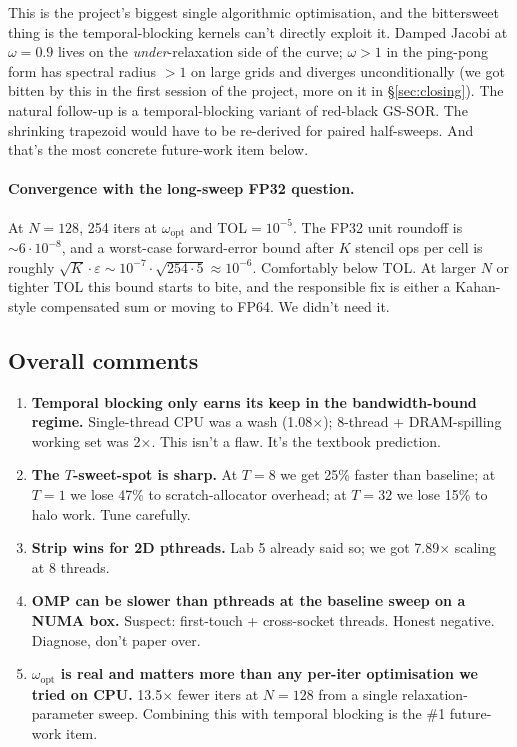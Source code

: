 \documentclass[11pt]{article}
\begin{document}
This is the project's biggest single algorithmic optimisation, and
the bittersweet thing is the temporal-blocking kernels can't directly
exploit it.  Damped Jacobi at $\omega = 0.9$ lives on the
\emph{under}-relaxation side of the curve; $\omega{>}1$ in the
ping-pong form has spectral radius $>1$ on large grids and diverges
unconditionally (we got bitten by this in the first session of the
project, more on it in §\ref{sec:closing}).  The natural follow-up
is a temporal-blocking variant of red-black GS-SOR. The
shrinking trapezoid would have to be re-derived for paired
half-sweeps. And that's the most concrete future-work item below.

\paragraph{Convergence with the long-sweep FP32 question.}  At
$N{=}128$, 254 iters at $\omega_{\text{opt}}$ and TOL$=10^{-5}$.
The FP32 unit roundoff is $\sim 6\cdot 10^{-8}$, and a worst-case
forward-error bound after $K$ stencil ops per cell is roughly
$\sqrt{K}\cdot\varepsilon \sim 10^{-7}\cdot\sqrt{254\cdot 5} \approx
10^{-6}$. Comfortably below TOL.  At larger $N$ or tighter TOL
this bound starts to bite, and the responsible fix is either a
Kahan-style compensated sum or moving to FP64.  We didn't need it.

\subsection{Overall comments}

\begin{enumerate}[leftmargin=1.4em,itemsep=2pt,topsep=2pt]
  \item \textbf{Temporal blocking only earns its keep in the
        bandwidth-bound regime.}  Single-thread CPU was a wash
        (1.08$\times$); 8-thread + DRAM-spilling working set was
        2$\times$.  This isn't a flaw. It's the textbook
        prediction.
  \item \textbf{The $T$-sweet-spot is sharp.}  At $T{=}8$ we get
        25\% faster than baseline; at $T{=}1$ we lose 47\% to
        scratch-allocator overhead; at $T{=}32$ we lose 15\% to
        halo work.  Tune carefully.
  \item \textbf{Strip wins for 2D pthreads.}  Lab 5 already said so;
        we got 7.89$\times$ scaling at 8 threads.
  \item \textbf{OMP can be slower than pthreads at the baseline
        sweep on a NUMA box.}  Suspect: first-touch + cross-socket
        threads.  Honest negative. Diagnose, don't paper over.
  \item \textbf{$\omega_{\text{opt}}$ is real and matters more than
        any per-iter optimisation we tried on CPU.}  13.5$\times$
        fewer iters at $N{=}128$ from a single relaxation-parameter
        sweep.  Combining this with temporal blocking is the
        \#1 future-work item.
\end{enumerate}
\end{document}

